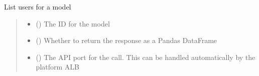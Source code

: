 \documentclass[letterpaper,10pt,english]{sphinxmanual}
\begin{document}
\begin{fulllineitems}
\begin{fulllineitems}
\label{\detokenize{aisquared.platform:aisquared.platform.AISquaredPlatformClient.AISquaredPlatformClient.list_model_users}}
\pysigstartsignatures
{}
\pysigstopsignatures
\sphinxAtStartPar
List users for a model

\begin{sphinxVerbatim}[commandchars=\\\{\}]
 
  
\end{sphinxVerbatim}
\begin{quote}\begin{description}
\begin{itemize}
\item {} 
\sphinxAtStartPar
{} () \textendash{} The ID for the model

\item {} 
\sphinxAtStartPar
{} (\sphinxstyleliteralemphasis{\sphinxupquote{ (}}\sphinxstyleliteralemphasis{\sphinxupquote{)}}) \textendash{} Whether to return the response as a Pandas DataFrame

\item {} 
\sphinxAtStartPar
{} (\sphinxstyleliteralemphasis{\sphinxupquote{ (}}\sphinxstyleliteralemphasis{\sphinxupquote{)}}) \textendash{} The API port for the call. This can be handled automatically by the platform ALB


\end{itemize}
\end{description}
\end{quote}
\end{fulllineitems}
\end{fulllineitems}
\end{document}
